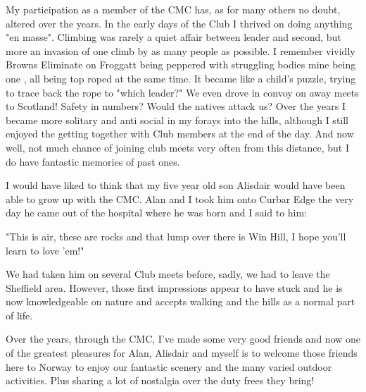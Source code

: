 \documentclass[a5paper,openany,font 10pt]{scrbook}
\begin{document}
My participation as a member of the CMC has, as for many
others no doubt, altered over the years. In the early days of the
Club I thrived on doing anything "en masse". Climbing was rarely
a quiet affair between leader and second, but more an invasion of
one climb by as many people as possible. I remember vividly
 Browns Eliminate  on Froggatt being peppered with struggling
bodies  mine being one , all being top roped at the same time. It
became like a child's puzzle, trying to trace back the rope to
"which leader?" We even drove in convoy on away meets to
Scotland! Safety in numbers? Would the natives attack us? Over
the years I became more solitary and anti social in my forays
into the hills, although I still enjoyed the getting together
with Club members at the end of the day. And now   well, not much
chance of joining club meets very often from this distance, but I
do have fantastic memories of past ones.

I would have liked to think that my five year old son
Alisdair would have been able to grow up with the CMC. Alan and I
took him onto Curbar Edge the very day he came out of the
hospital where he was born and I said to him:

"This is air, these are rocks and that lump over there is
Win Hill, I hope you'll learn to love 'em!"

We had taken him on several Club meets before, sadly, we had
to leave the Sheffield area. However, those first impressions
appear to have stuck and he is now knowledgeable on nature and
accepts walking and the hills as a normal part of life.

Over the years, through the CMC, I've made some very good
friends and now one of the greatest pleasures for Alan, Alisdair
and myself is to welcome those friends here to Norway to enjoy
our fantastic scenery and the many varied outdoor activities.
Plus sharing a lot of nostalgia over the duty frees they bring!
\end{document}
